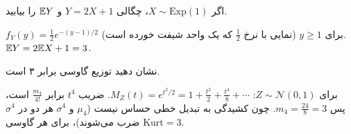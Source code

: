 \begin{exercise}
اگر $X\sim\mathrm{Exp}(1)$، چگالی $Y=2X+1$ و $\mathbb{E} Y$ را بیابید.
\end{exercise}
\begin{solution}
$f_Y(y)=\frac12e^{-(y-1)/2}$ برای $y\ge1$ (نمایی با نرخ $\frac12$ که یک واحد شیفت خورده است). $\mathbb{E} Y=2\mathbb{E} X+1=3$.
\end{solution}

\begin{exercise}
نشان دهید  توزیع گاوسی برابر ۳ است.
\end{exercise}
\begin{solution}
برای $Z\sim\mathcal N(0,1)$: $M_Z(t)=e^{t^2/2}=1+\frac{t^2}{2}+\frac{t^4}{8}+\cdots$. ضریب $t^4$ برابر $\frac{m_4}{4!}$ است، پس $m_4=\frac{24}{8}=3$. چون کشیدگی به تبدیل خطی حساس نیست ($\mu_4$ و $\sigma^4$ هر دو در $\sigma^4$ ضرب می‌شوند)، برای هر گاوسی $\mathrm{Kurt}=3$.
\end{solution}
